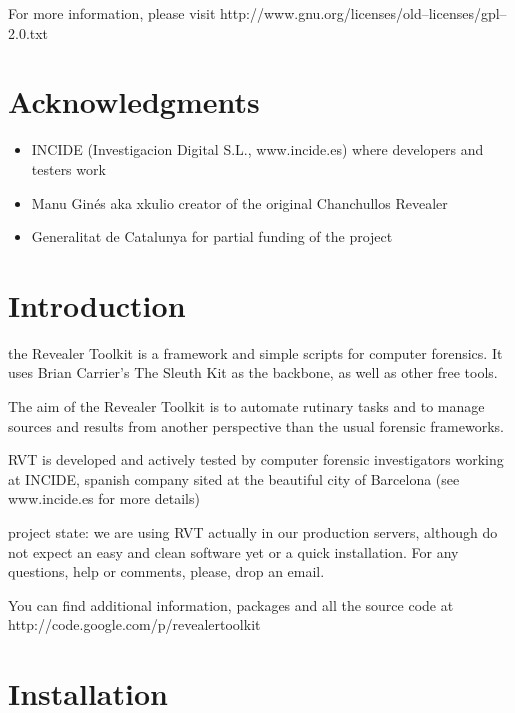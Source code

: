 \documentclass[a4paper,11pt,oneside]{report}
\begin{document}
     For more information, please visit
     http://www.gnu.org/licenses/old--licenses/gpl--2.0.txt


\chapter{Acknowledgments}

\begin{itemize}
     \item INCIDE (Investigacion Digital S.L., www.incide.es)
       where developers and testers work
     \item Manu Ginés aka xkulio 
       creator of the original Chanchullos Revealer
     \item Generalitat de Catalunya
       for partial funding of the project
\end{itemize}



\chapter{Introduction}

the Revealer Toolkit is a framework and simple scripts for computer forensics. It uses Brian Carrier's The Sleuth Kit as the backbone, as well as other free tools.

The aim of the Revealer Toolkit is to automate rutinary tasks and to manage sources and results from another perspective than the usual forensic frameworks.

RVT is developed and actively tested by computer forensic investigators working at INCIDE, spanish company sited at the beautiful city of Barcelona (see www.incide.es for more details)

project state: we are using RVT actually in our production servers, although do not expect an easy and clean software yet or a quick installation. For any questions, help or comments, please, drop an email.

You can find additional information, packages and all the source code at http://code.google.com/p/revealertoolkit





\chapter{Installation} \label{sec:installation}
\end{document}
